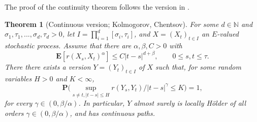 \documentclass{article}
\newtheorem{theorem}{Theorem}
\theoremstyle{definition}
\theoremstyle{step} \newtheorem{step}{Step}
\begin{document}
\noindent
The proof of the continuity theorem follows the version in
\cite{karatzas1991brownian}.

\begin{theorem}[Continuous version; Kolmogorov, Chentsov]
  \label{T:kolchen}
  For some $d\in\mathbb N$ and
  $\sigma_1,\tau_1,...,\sigma_d,\tau_d>0$, let $I = \prod_{i=1}^d
    [\sigma_i,\tau_i]$, and $X = (X_t)_{t\in I}$ an $E$-valued
  stochastic process. Assume that there are $\alpha, \beta, C>0$ with
  $$ \mathbf E[r(X_s, X_t)^\alpha] \leq C|t-s|^{d+\beta}, \qquad 0\leq
    s,t\leq \tau.$$ There there exists a version $Y = (Y_t)_{t\in I}$ of
  $X$ such that, for some random variables $H>0$ and $K<\infty$,
  $$ \mathbf P\Big(\sup_{s\neq t, |t-s| \leq H} r(Y_s,
    Y_t)/|t-s|^\gamma \leq K\Big) = 1,
  $$ for every $\gamma\in(0,\beta/\alpha)$. In particular, $Y$ almost
  surely is locally Hölder of all orders $\gamma\in(0,\beta/\alpha)$,
  and has continuous paths.
\end{theorem}
\end{document}

